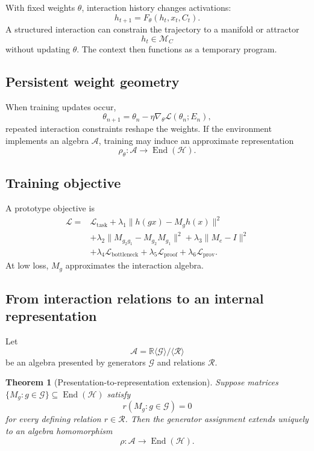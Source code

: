 \documentclass[11pt]{article}
\newtheorem{theorem}{Theorem}[section]
\theoremstyle{definition}
\theoremstyle{remark}
\newcommand{\Lat}{\mathcal H}
\newcommand{\End}{\operatorname{End}}
\begin{document}
With fixed weights \(\theta\), interaction history changes activations:
\[
h_{t+1}=F_\theta(h_t,x_t,C_t).
\]
A structured interaction can constrain the trajectory to a manifold or attractor
\[
h_t\in\mathcal M_C
\]
without updating \(\theta\). The context then functions as a temporary program.

\subsection{Persistent weight geometry}

When training updates occur,
\[
\theta_{n+1}=\theta_n-\eta\nabla_\theta\mathcal L(\theta_n;E_n),
\]
repeated interaction constraints reshape the weights. If the environment implements an algebra \(\mathcal A\), training may induce an approximate representation
\[
\rho_\theta:\mathcal A\to\End(\Lat).
\]

\subsection{Training objective}

A prototype objective is
\[
\begin{aligned}
\mathcal L={}&\mathcal L_{\mathrm{task}}
+\lambda_1\|h(gx)-M_gh(x)\|^2\\
&+\lambda_2\|M_{g_2g_1}-M_{g_2}M_{g_1}\|^2
+\lambda_3\|M_e-I\|^2\\
&+\lambda_4\mathcal L_{\mathrm{bottleneck}}
+\lambda_5\mathcal L_{\mathrm{proof}}
+\lambda_6\mathcal L_{\mathrm{prov}}.
\end{aligned}
\]
At low loss, \(M_g\) approximates the interaction algebra.

\subsection{From interaction relations to an internal representation}

Let
\[
\mathcal A
=
\mathbb R\langle\mathcal G\rangle/\langle\mathcal R\rangle
\]
be an algebra presented by generators \(\mathcal G\) and relations \(\mathcal R\).

\begin{theorem}[Presentation-to-representation extension]
Suppose matrices \(\{M_g:g\in\mathcal G\}\subseteq\End(\Lat)\) satisfy
\[
r(M_g:g\in\mathcal G)=0
\]
for every defining relation \(r\in\mathcal R\). Then the generator assignment extends uniquely to an algebra homomorphism
\[
\rho:\mathcal A\to\End(\Lat).
\]
\end{theorem}
\end{document}

